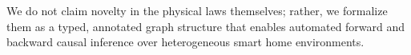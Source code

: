 We do not claim novelty in the physical laws themselves; rather, we formalize them as a typed, annotated graph structure that enables automated forward and backward causal inference over heterogeneous smart home environments.